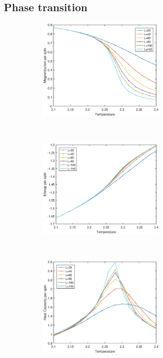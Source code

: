 \subsection{Phase transition}\label{sec:transitionresult}
\begin{figure}[tb]
	\begin{subfigure}[tb]{0.5\textwidth}
		\centering
		\includegraphics[width=0.7\textwidth]{Tran_mag.eps}
		\caption{}
	\end{subfigure}
	~
	\begin{subfigure}[tb]{0.5\textwidth}
		\centering
		\includegraphics[width=0.7\textwidth]{Tran_ene.eps}		
		\caption{}
	\end{subfigure}
	~
	\begin{subfigure}[tb]{0.5\textwidth}
		\centering
		\includegraphics[width=0.7\textwidth]{Tran_Cv.eps}		

\end{subfigure}
\end{figure}
